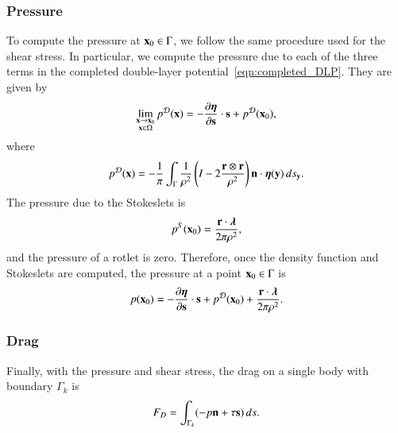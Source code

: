 \documentclass[preprint, 10pt]{elsarticle}
\begin{document}
\subsubsection{Pressure}
To compute the pressure at ${\mathbf{x}}_0 \in \Gamma$, we follow the same
procedure used for the shear stress.  In particular, we compute the
pressure due to each of the three terms in the completed double-layer
potential~\eqref{eqn:completed_DLP}.  They are given by
\begin{align*}
  \lim_{\substack{{\mathbf{x}} \rightarrow {\mathbf{x}}_0 \\ {\mathbf{x}} \in \Omega}}p^{\mathcal{D}}({\mathbf{x}}) =  
  -\frac{\partial {\boldsymbol\eta}}{\partial {\mathbf{s}}} \cdot {\mathbf{s}} + p^{{\mathcal{D}}}({\mathbf{x}}_0),
\end{align*}
where
\begin{align*}
  p^{\mathcal{D}}({\mathbf{x}}) = -\frac{1}{\pi}\int_{\Gamma} \frac{1}{\rho^2}
    \left(I - 2 \frac{{\mathbf{r}} \otimes {\mathbf{r}}}{\rho^2}\right) 
    {\mathbf{n}} \cdot {\boldsymbol\eta}({\mathbf{y}}) \,ds_{\mathbf{y}}.
\end{align*}
The pressure due to the Stokeslets is
\begin{align}
  p^S({\mathbf{x}}_0) = \frac{{\mathbf{r}} \cdot {\boldsymbol\lambda}}{2\pi\rho^2},
  \label{eqn:pressureDLP}
\end{align}
and the pressure of a rotlet is zero.  Therefore, once the density
function and Stokeslets are computed, the pressure at a point ${\mathbf{x}}_0 \in
\Gamma$ is
\begin{align*}
  p({\mathbf{x}}_0) = -\frac{\partial {\boldsymbol\eta}}{\partial {\mathbf{s}}} \cdot {\mathbf{s}} + p^{{\mathcal{D}}}({\mathbf{x}}_0) + 
              \frac{{\mathbf{r}} \cdot {\boldsymbol\lambda}}{2\pi\rho^2}.
\end{align*}

\subsubsection{Drag}
Finally, with the pressure and shear stress, the drag on a single body
with boundary $\Gamma_k$ is
\begin{align*}
  F_D = \int_{\Gamma_k} (-p {\mathbf{n}} + \tau {\mathbf{s}})\,ds.
\end{align*}


\end{document}
